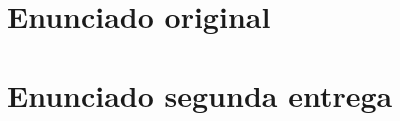 \documentclass[a4paper,11pt]{article}
\begin{document}
\section{Enunciado original}\label{sec:enunciado}


\section{Enunciado segunda entrega}\label{sec:enunciado}

\end{document}
